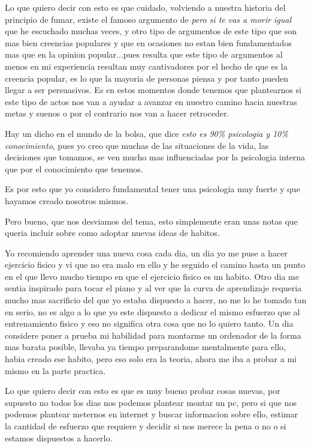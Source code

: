 Lo que quiero decir con esto es que cuidado, volviendo a nuestra historia del principio de fumar, existe el famoso argumento de \textit{pero si te vas a morir igual} que he escuchado muchas veces, y otro tipo de argumentos de este tipo que son mas bien creencias populares y que en ocasiones no estan bien fundamentados mas que en la opinion popular...pues resulta que este tipo de argumentos al menos en mi experiencia resultan muy cautivadores por el hecho de que es la creencia popular, es lo que la mayoria de personas piensa y por tanto pueden llegar a ser persuasivos. Es en estos momentos donde tenemos que plantearnos si este tipo de actos nos van a ayudar a avanzar en nuestro camino hacia nuestras metas y suenos o por el contrario nos van a hacer retroceder.

Hay un dicho en el mundo de la bolsa, que dice \textit{esto es 90\% psicologia y 10\% conocimiento}, pues yo creo que muchas de las situaciones de la vida, las decisiones que tomamos, se ven mucho mas influenciadas por la psicologia interna que por el conocimiento que tenemos.

Es por esto que yo considero fundamental tener una psicologia muy fuerte y que hayamos creado nosotros mismos.

Pero bueno, que nos desviamos del tema, esto simplemente eran unas notas que queria incluir sobre como adoptar nuevas ideas de habitos.

Yo recomiendo aprender una nueva cosa cada dia, un dia yo me puse a hacer ejercicio fisico y vi que no era malo en ello y he seguido el camino hasta un punto en el que llevo mucho tiempo en que el ejercicio fisico es un habito. Otro dia me sentia inspirado para tocar el piano y al ver que la curva de aprendizaje requeria mucho mas sacrificio del que yo estaba dispuesto a hacer, no me lo he tomado tan en serio, no es algo a lo que yo este dispuesto a dedicar el mismo esfuerzo que al entrenamiento fisico y eso no significa otra cosa que no lo quiero tanto. Un dia considere poner a prueba mi habilidad para montarme un ordenador de la forma mas barata posible, llevaba ya tiempo preparandome mentalmente para ello, habia creado ese habito, pero eso solo era la teoria, ahora me iba a probar a mi mismo en la parte practica.

Lo que quiero decir con esto es que es muy bueno probar cosas nuevas, por supuesto no todos los dias nos podemos plantear montar un pc, pero si que nos podemos plantear meternos en internet y buscar informacion sobre ello, estimar la cantidad de esfuerzo que requiere y decidir si nos merece la pena o no o si estamos dispuestos a hacerlo.

